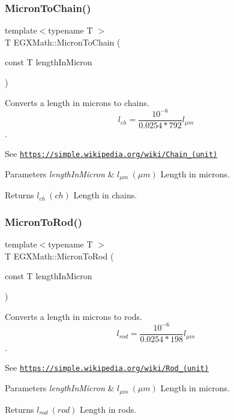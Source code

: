 \subsubsection{\texorpdfstring{Micron\+To\+Chain()}{MicronToChain()}}
{\footnotesize\ttfamily template$<$typename T $>$ \\
T E\+G\+X\+Math\+::\+Micron\+To\+Chain (\begin{DoxyParamCaption}\item[{const T}]{length\+In\+Micron }\end{DoxyParamCaption})}



Converts a length in microns to chains. \[ l_{ch}= \frac{10^{-6}}{0.0254 * 792} l_{\mu m} \]. 

See \href{https://simple.wikipedia.org/wiki/Chain_(unit)}{\tt https\+://simple.\+wikipedia.\+org/wiki/\+Chain\+\_\+(unit)} 
\begin{DoxyParams}{Parameters}
{\em length\+In\+Micron} & $ l_{\mu m}\ (\mu m)$ Length in microns. \\
\hline
\end{DoxyParams}
\begin{DoxyReturn}{Returns}
$ l_{ch}\ (ch)$ Length in chains. 
\end{DoxyReturn}
\mbox{\label{group___e_g_x_math-_conversions-_length_conversions-_non-_s_i-_micron-_surveyors_gae81e23a6186148740d3b610089ba3c2e}} 
\subsubsection{\texorpdfstring{Micron\+To\+Rod()}{MicronToRod()}}
{\footnotesize\ttfamily template$<$typename T $>$ \\
T E\+G\+X\+Math\+::\+Micron\+To\+Rod (\begin{DoxyParamCaption}\item[{const T}]{length\+In\+Micron }\end{DoxyParamCaption})}



Converts a length in microns to rods. \[ l_{rod}= \frac{10^{-6}}{0.0254 * 198} l_{\mu m} \]. 

See \href{https://simple.wikipedia.org/wiki/Rod_(unit)}{\tt https\+://simple.\+wikipedia.\+org/wiki/\+Rod\+\_\+(unit)} 
\begin{DoxyParams}{Parameters}
{\em length\+In\+Micron} & $ l_{\mu m}\ (\mu m)$ Length in microns. \\
\hline
\end{DoxyParams}
\begin{DoxyReturn}{Returns}
$ l_{rod}\ (rod)$ Length in rods. 
\end{DoxyReturn}
